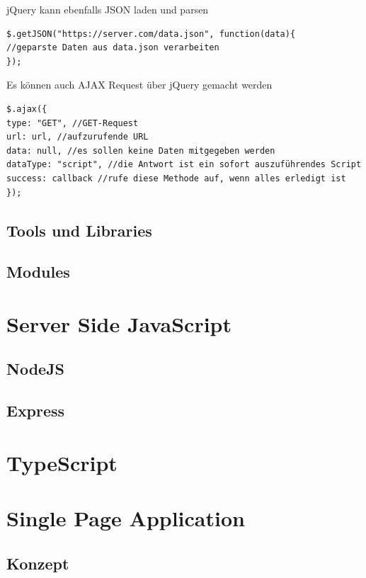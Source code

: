 \documentclass[a4paper, 11pt]{article}
\begin{document}
\vspace{10px}

\noindent jQuery kann ebenfalls JSON laden und parsen
\begin{lstlisting}
$.getJSON("https://server.com/data.json", function(data){
//geparste Daten aus data.json verarbeiten
});
\end{lstlisting}

\vspace{10px}

\noindent Es können auch AJAX Request über jQuery gemacht werden
\begin{lstlisting}
$.ajax({
type: "GET", //GET-Request
url: url, //aufzurufende URL
data: null, //es sollen keine Daten mitgegeben werden
dataType: "script", //die Antwort ist ein sofort auszuführendes Script
success: callback //rufe diese Methode auf, wenn alles erledigt ist
});
\end{lstlisting}
\subsection{Tools und Libraries}

\subsection{Modules}

\section{Server Side JavaScript}
\subsection{NodeJS}

\subsection{Express}

\section{TypeScript}

\section{Single Page Application}
\subsection{Konzept}
\end{document}
